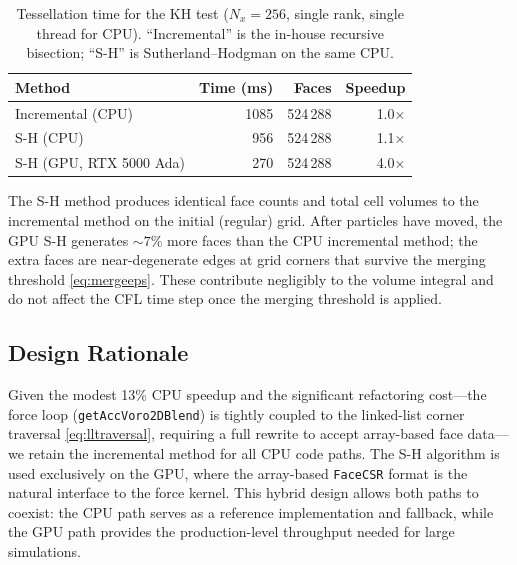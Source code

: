 \documentclass[twocolumn]{aastex63}
\begin{document}
\begin{table}[h]
\caption{Tessellation time for the KH test ($N_x=256$, single rank,
single thread for CPU).  ``Incremental'' is the in-house recursive
bisection; ``S-H'' is Sutherland--Hodgman on the same CPU.
\label{tab:tessbench}}
\centering
\setlength{\tabcolsep}{4pt}
\begin{tabular}{lrrr}
\toprule
Method & Time (ms) & Faces & Speedup \\
\midrule
Incremental (CPU) & 1085 & 524\,288 & 1.0$\times$ \\
S-H (CPU)         &  956 & 524\,288 & 1.1$\times$ \\
S-H (GPU, RTX 5000 Ada) & 270 & 524\,288 & 4.0$\times$ \\
\bottomrule
\end{tabular}
\end{table}

The S-H method produces identical face counts and total cell volumes
to the incremental method on the initial (regular) grid.  After
particles have moved, the GPU S-H generates $\sim\!7$\% more faces
than the CPU incremental method; the extra faces are near-degenerate
edges at grid corners that survive the merging threshold
\eqref{eq:mergeeps}.  These contribute negligibly to the volume
integral and do not affect the CFL time step once the merging
threshold is applied.

\subsection{Design Rationale}

Given the modest 13\% CPU speedup and the significant refactoring
cost---the force loop (\texttt{getAccVoro2DBlend}) is tightly
coupled to the linked-list corner traversal \eqref{eq:lltraversal},
requiring a full rewrite to accept array-based face data---we retain
the incremental method for all CPU code paths.  The S-H algorithm is
used exclusively on the GPU, where the array-based \texttt{FaceCSR}
format is the natural interface to the force kernel.  This hybrid
design allows both paths to coexist: the CPU path serves as a
reference implementation and fallback, while the GPU path provides
the production-level throughput needed for large simulations.





\end{document}

